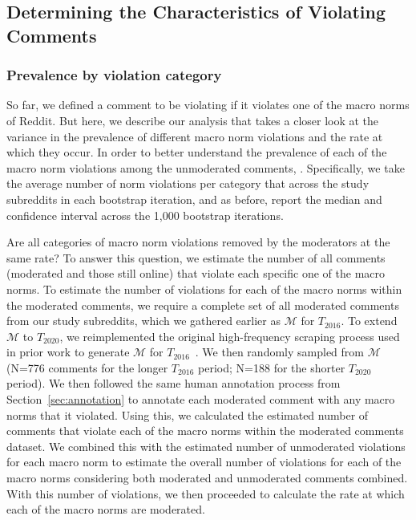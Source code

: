 \subsection{Determining the Characteristics of Violating Comments}

\subsubsection{Prevalence by violation category} 
So far, we defined a comment to be violating if it violates one of the macro norms of Reddit. But here, we describe our analysis that takes a closer look at the variance in the prevalence of different macro norm violations and the rate at which they occur. In order to better understand the prevalence of each of the macro norm violations among the unmoderated comments, . Specifically, we take the average number of norm violations per category that across the study subreddits in each bootstrap iteration, and as before, report the median and confidence interval across the 1,000 bootstrap iterations.

Are all categories of macro norm violations removed by the moderators at the same rate? To answer this question, we  estimate the number of all comments (moderated and those still online) that violate each specific one of the macro norms. To estimate the number of violations for each of the macro norms within the moderated comments, we require a complete set of all moderated comments from our study subreddits, which we gathered earlier as $\mathcal{M}$ for $T_{2016}$. To extend $\mathcal{M}$ to $T_{2020}$, we reimplemented the original high-frequency scraping process used in prior work to generate $\mathcal{M}$ for $T_{2016}$~\cite{Chandrasekharan2018internet}. We then randomly sampled from $\mathcal{M}$ (N=776 comments for the longer $T_{2016}$ period; N=188 for the shorter $T_{2020}$ period). We then followed the same human annotation process from Section~\ref{sec:annotation} to annotate each moderated comment with any macro norms that it violated. Using this, we calculated the estimated number of comments that violate each of the macro norms within the moderated comments dataset. We combined this with the estimated number of unmoderated violations for each macro norm to estimate the overall number of violations for each of the macro norms considering both moderated and unmoderated comments combined. With this number of violations, we then proceeded to calculate the rate at which each of the macro norms are moderated.

